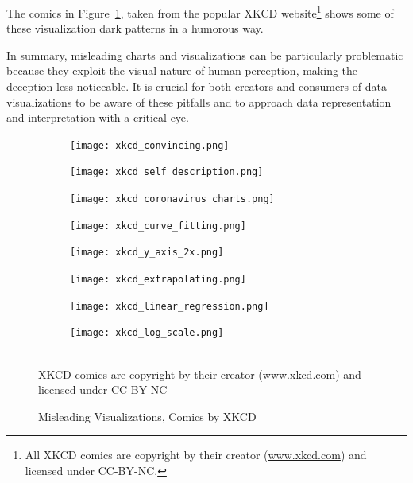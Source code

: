 The comics in Figure~\ref{fig:xkcd}, taken from the popular XKCD website\footnote{All XKCD comics are copyright by their creator (\url{www.xkcd.com}) and licensed under CC-BY-NC.} shows some of these visualization dark patterns in a humorous way. 

In summary, misleading charts and visualizations can be particularly problematic because they exploit the visual nature of human perception, making the deception less noticeable. It is crucial for both creators and consumers of data visualizations to be aware of these pitfalls and to approach data representation and interpretation with a critical eye.

\begin{figure}
\centering
\begin{subfigure}{.49\textwidth}
\centering
\texttt{[image: xkcd\_convincing.png]}
\end{subfigure}
\hfill
\begin{subfigure}{.49\textwidth}
\centering
  \texttt{[image: xkcd\_self\_description.png]} 
\end{subfigure}
\hfill
\begin{subfigure}{.49\textwidth}
\centering
  \texttt{[image: xkcd\_coronavirus\_charts.png]}
\end{subfigure}
\hfill
\begin{subfigure}{.49\textwidth}
\centering
  \texttt{[image: xkcd\_curve\_fitting.png]}
\end{subfigure}
\hfill
\begin{subfigure}{.49\textwidth}
\centering
  \texttt{[image: xkcd\_y\_axis\_2x.png]}
\end{subfigure}
\hfill
\begin{subfigure}{.49\textwidth}
\centering
  \texttt{[image: xkcd\_extrapolating.png]}
\end{subfigure}
\hfill
\begin{subfigure}{.49\textwidth}
\centering
  \texttt{[image: xkcd\_linear\_regression.png]}
\end{subfigure}
\hfill
\begin{subfigure}{.49\textwidth}
\centering
  \texttt{[image: xkcd\_log\_scale.png]}
\end{subfigure}
 \\ 
\tiny \scriptsize{XKCD comics are copyright by their creator (\url{www.xkcd.com}) and licensed under CC-BY-NC}

\caption{Misleading Visualizations, Comics by XKCD}
\label{fig:xkcd}
\end{figure}


